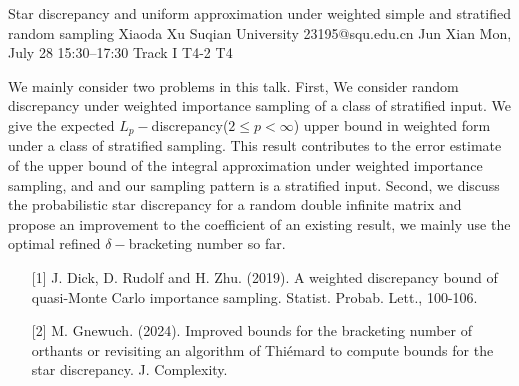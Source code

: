 \begin{talk}
  {Star discrepancy and uniform approximation under weighted simple and stratified random sampling}%
  {Xiaoda Xu}%
  {Suqian University}%
  {23195@squ.edu.cn}%
  {Jun Xian}%
  {}%
  {Mon, July 28 15:30–17:30 Track I}%
  {T4-2}%
  {T4}%
			
We mainly consider two problems in this talk. First, We consider random discrepancy under weighted importance sampling of a class of stratified input. We give the expected $L_p-$discrepancy($2\leq p<\infty$) upper bound in weighted form under a class of stratified sampling. This result contributes to the error estimate of the upper bound of the integral approximation under weighted importance sampling, and and our sampling pattern is a stratified input. Second, we discuss the probabilistic star discrepancy for a random double infinite matrix and propose an improvement to the coefficient of an existing result, we mainly use the optimal refined $\delta-$bracketing number so far.
\medskip


\begin{enumerate}
	\item[{[1]}] J. Dick, D. Rudolf and H. Zhu. (2019). A weighted discrepancy bound of quasi-Monte Carlo importance sampling. Statist. Probab. Lett., 100-106.
	\item[{[2]}] M. Gnewuch. (2024). Improved bounds for the bracketing number of orthants or revisiting an algorithm of Thiémard to compute bounds for the star discrepancy. J. Complexity.
\end{enumerate}


\end{talk}
